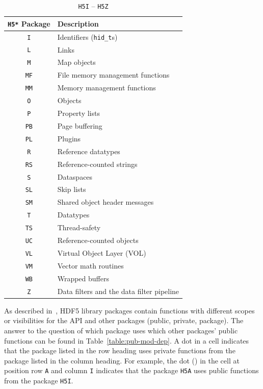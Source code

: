 \begin{table}[h]
\begin{tabular}{||c|l||}
\hline
\textbf{\texttt{H5*} Package} & \textbf{Description} \\  [0.5ex] 
\hline\hline
\texttt{I} & Identifiers (\texttt{hid\_t}s) \\
\texttt{L} & Links \\
\texttt{M} & Map objects \\
\texttt{MF} & File memory management functions \\
\texttt{MM} & Memory management functions \\
\texttt{O} & Objects \\
\texttt{P} & Property lists \\
\texttt{PB} & Page buffering \\
\texttt{PL} & Plugins \\
\texttt{R} & Reference datatypes \\
\texttt{RS} & Reference-counted strings \\
\texttt{S} & Dataspaces \\
\texttt{SL} & Skip lists \\
\texttt{SM} & Shared object header messages \\
\texttt{T} & Datatypes \\
\texttt{TS} & Thread-safety \\
\texttt{UC} & Reference-counted objects \\
\texttt{VL} & Virtual Object Layer (VOL) \\
\texttt{VM} & Vector math routines \\
\texttt{WB} & Wrapped buffers \\
\texttt{Z} & Data filters and the data filter pipeline \\
\hline
\end{tabular}
\caption{\texttt{H5I} -- \texttt{H5Z}}
\label{table:H5prefixesIZ}
\end{table}

As described in~\cite{libhdf5-dev-101}, HDF5 library packages contain functions with different scopes or visibilities for the API and other packages (public, private, package).
The answer to the question of which package uses which other packages' public functions can be found in Table~\ref{table:pub-mod-dep}. A dot in a cell indicates that the package listed in the row heading uses private functions from the package listed in the column heading. For example, the dot (\textbullet) in the cell at position row \texttt{A} and column \texttt{I} indicates that the package \texttt{H5A} uses public functions from the package \texttt{H5I}.

